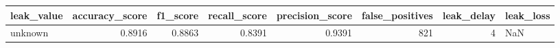 \begin{tabular}{lrrrrrrl}
\toprule
leak\_value & accuracy\_score & f1\_score & recall\_score & precision\_score & false\_positives & leak\_delay & leak\_loss \\
\midrule
unknown & 0.8916 & 0.8863 & 0.8391 & 0.9391 & 821 & 4 & NaN \\
\bottomrule
\end{tabular}
